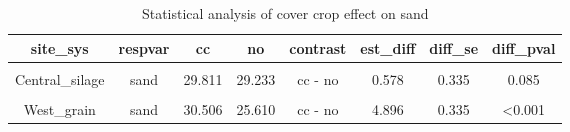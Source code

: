 \documentclass[
]{article}
\begin{document}
\begin{table}[H]

\caption{\label{tab:clay}Statistical analysis of cover crop effect on sand}
\centering
\begin{tabular}[t]{cccccccc}
\toprule
site\_sys & respvar & cc & no & contrast & est\_diff & diff\_se & diff\_pval\\
\midrule
\cellcolor{gray!6}{Central\_grain} & \cellcolor{gray!6}{sand} & \cellcolor{gray!6}{32.486} & \cellcolor{gray!6}{31.600} & \cellcolor{gray!6}{cc - no} & \cellcolor{gray!6}{0.886} & \cellcolor{gray!6}{0.299} & \cellcolor{gray!6}{0.003}\\
Central\_silage & sand & 29.811 & 29.233 & cc - no & 0.578 & 0.335 & 0.085\\
\cellcolor{gray!6}{East\_grain} & \cellcolor{gray!6}{sand} & \cellcolor{gray!6}{12.715} & \cellcolor{gray!6}{9.837} & \cellcolor{gray!6}{cc - no} & \cellcolor{gray!6}{2.877} & \cellcolor{gray!6}{0.335} & \cellcolor{gray!6}{<0.001}\\
West\_grain & sand & 30.506 & 25.610 & cc - no & 4.896 & 0.335 & <0.001\\
\bottomrule
\end{tabular}
\end{table}
\end{document}
